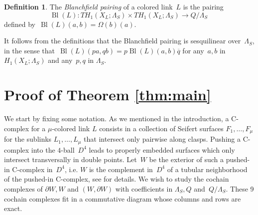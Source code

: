\documentclass[11pt,a4paper]{amsart}
\theoremstyle{definition}
\newtheorem{definition}[theorem]{Definition}
\begin{document}
\begin{definition}
\label{def:BlanchfieldLinks}
The \textit{Blanchfield pairing} of a colored link~$L$ is the pairing
$$ \operatorname{Bl}(L) \colon  TH_1(X_L;\Lambda_S) \times  TH_1(X_L;\Lambda_S) \rightarrow Q/\Lambda_S ~$$
defined by~$\operatorname{Bl}(L)(a,b)=\Omega(b)(a).$
\end{definition}

It follows from the definitions that the Blanchfield pairing is sesquilinear over~$\Lambda_S$, in the sense that~$\operatorname{Bl}(L)(pa,qb)=p\operatorname{Bl}(L)(a,b)\overline{q}$ for any~$a,b$ in $H_1(X_L;\Lambda_S)$ and any~$p,q$ in $\Lambda_S.$


\section{Proof of Theorem \ref{thm:main}}
\label{sec:ProofMain}

We start by fixing some notation. As we mentioned in the introduction, a C-complex for a $\mu$-colored link $L$ consists in a collection of Seifert surfaces $F_1, \dots , F_\mu$ for the sublinks $L_1, \dots , L_\mu$ that intersect only pairwise along clasps. Pushing a C-complex into the $4$-ball~$D^4$ leads to properly embedded surfaces which only intersect transversally in double points. Let~$W$ be the exterior of such a pushed-in C-complex in~$D^4$, i.e. $W$ is the complement in~$D^4$ of a tubular neighborhood of the pushed-in C-complex, see \cite[Section 3]{ConwayFriedlToffoli} for details. We wish to study the cochain complexes of $\partial W, W$ and $(W,\partial W)$ with coefficients in $\Lambda_S, Q$ and~$Q/\Lambda_S$. These 9 cochain complexes fit in a commutative diagram whose columns and rows are exact. 
\end{document}
